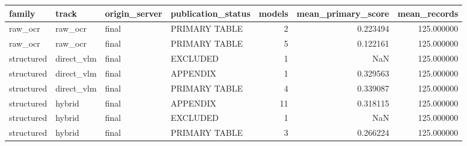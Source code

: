 \begin{tabular}{llllrrr}
\toprule
family & track & origin\_server & publication\_status & models & mean\_primary\_score & mean\_records \\
\midrule
raw\_ocr & raw\_ocr & final & PRIMARY TABLE & 2 & 0.223494 & 125.000000 \\
raw\_ocr & raw\_ocr & final & PRIMARY TABLE & 5 & 0.122161 & 125.000000 \\
structured & direct\_vlm & final & EXCLUDED & 1 & NaN & 125.000000 \\
structured & direct\_vlm & final & APPENDIX & 1 & 0.329563 & 125.000000 \\
structured & direct\_vlm & final & PRIMARY TABLE & 4 & 0.339087 & 125.000000 \\
structured & hybrid & final & APPENDIX & 11 & 0.318115 & 125.000000 \\
structured & hybrid & final & EXCLUDED & 1 & NaN & 125.000000 \\
structured & hybrid & final & PRIMARY TABLE & 3 & 0.266224 & 125.000000 \\
\bottomrule
\end{tabular}
